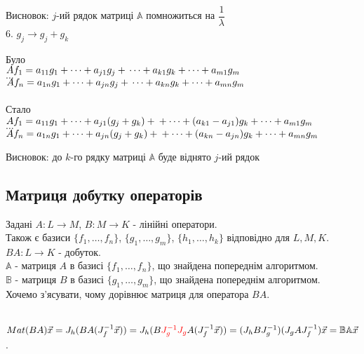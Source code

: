 \documentclass[a4paper, 10pt]{article}
\theoremstyle{theoremdd}
\theoremstyle{theoremdd}
\theoremstyle{theoremdd}
\theoremstyle{theoremdd}
\theoremstyle{theoremdd}
\theoremstyle{theoremdd}
\theoremstyle{theoremdd}
\theoremstyle{theoremdd}
\begin{document}
	Висновок: $j$-ий рядок матриці $\mathbb{A}$ помножиться на $\dfrac{1}{\lambda}$
	\bigskip \\
	6. $g_j \rightarrow g_j + g_k$
	\multicolsep=0pt
	\begin{multicols}{2}
	Було \\
	$Af_1 = a_{11}g_1 + \dots + a_{j1}g_j + \\ \dots + a_{k1}g_k + \dots + a_{m1}g_m$\\
	$\dots$\\
	$Af_n = a_{1n}g_1 + \dots + a_{jn}g_j + \\ \dots + a_{kn}g_k + \dots + a_{mn}g_m$\\
	\columnbreak
	\\
	Стало \\
	$Af_1 = a_{11}g_1 + \dots + a_{j1}(g_j+g_k) + \\ + \dots + (a_{k1}-a_{j1})g_k + \dots + a_{m1}g_m$\\
	$\dots$\\
	$Af_n = a_{1n}g_1 + \dots + a_{jn}(g_j+g_k) + \\ + \dots + (a_{kn}-a_{jn})g_k + \dots + a_{mn}g_m$
	\end{multicols}
	Висновок: до $k$-го рядку матриці $\mathbb{A}$ буде віднято $j$-ий рядок
	\fi
	
	\subsection{Матриця добутку операторів}
	Задані $A: L \to M$, $B: M \to K$ - лінійні оператори.\\
	Також є базиси $\{f_1,\dots, f_n\}$, $\{g_1,\dots, g_m\}$, $\{h_1,\dots, h_k\}$ відповідно для $L,M,K$.\\
	$BA: L \to K$ - добуток.\\
	$\mathbb{A}$ - матриця $A$ в базисі $\{f_1,\dots,f_n\}$, що знайдена попереднім алгоритмом.\\
	$\mathbb{B}$ - матриця $B$ в базисі $\{g_1,\dots,g_m\}$, що знайдена попереднім алгоритмом.\\
	Хочемо з'ясувати, чому дорівнює матриця для оператора $BA$.\\
	\\
	$Mat(BA)\vec{x} = J_h(BA(J_f^{-1} \vec{x})) = J_h(B \textcolor{red}{J_g^{-1} J_g} A(J_f^{-1} \vec{x})) = (J_h B J_g^{-1})(J_g A J_f^{-1}) \vec{x} = \mathbb{B} \mathbb{A} \vec{x}$.
\end{document}
